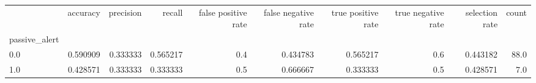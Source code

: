 \begin{tabular}{lrrrrrrrrr}
\toprule
{} &  accuracy &  precision &    recall &  false positive rate &  false negative rate &  true positive rate &  true negative rate &  selection rate &  count \\
passive\_alert &           &            &           &                      &                      &                     &                     &                 &        \\
\midrule
0.0           &  0.590909 &   0.333333 &  0.565217 &                  0.4 &             0.434783 &            0.565217 &                 0.6 &        0.443182 &   88.0 \\
1.0           &  0.428571 &   0.333333 &  0.333333 &                  0.5 &             0.666667 &            0.333333 &                 0.5 &        0.428571 &    7.0 \\
\bottomrule
\end{tabular}
